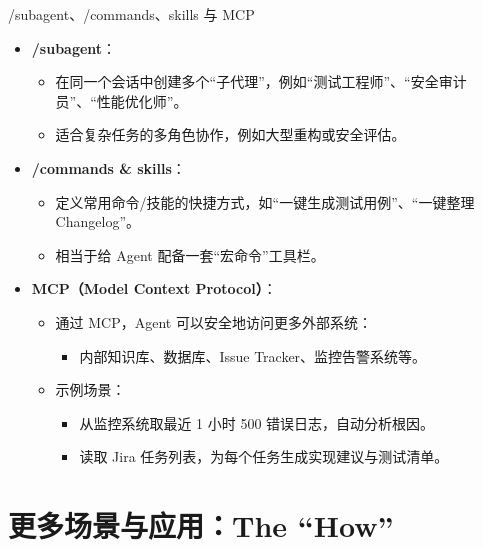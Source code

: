 \documentclass[10pt,aspectratio=169]{beamer}
\begin{document}
\begin{frame}{/subagent、/commands、skills 与 MCP}
  \begin{itemize}
    \item \textbf{/subagent}：
      \begin{itemize}
        \item 在同一个会话中创建多个“子代理”，例如“测试工程师”、“安全审计员”、“性能优化师”。
        \item 适合复杂任务的多角色协作，例如大型重构或安全评估。
      \end{itemize}
    \item \textbf{/commands \& skills}：
      \begin{itemize}
        \item 定义常用命令/技能的快捷方式，如“一键生成测试用例”、“一键整理 Changelog”。
        \item 相当于给 Agent 配备一套“宏命令”工具栏。
      \end{itemize}
    \item \textbf{MCP（Model Context Protocol）}：
      \begin{itemize}
        \item 通过 MCP，Agent 可以安全地访问更多外部系统：
          \begin{itemize}
            \item 内部知识库、数据库、Issue Tracker、监控告警系统等。
          \end{itemize}
        \item 示例场景：
          \begin{itemize}
            \item 从监控系统取最近 1 小时 500 错误日志，自动分析根因。
            \item 读取 Jira 任务列表，为每个任务生成实现建议与测试清单。
          \end{itemize}
      \end{itemize}
  \end{itemize}
\end{frame}

\section{更多场景与应用：The ``How''}
\end{document}
